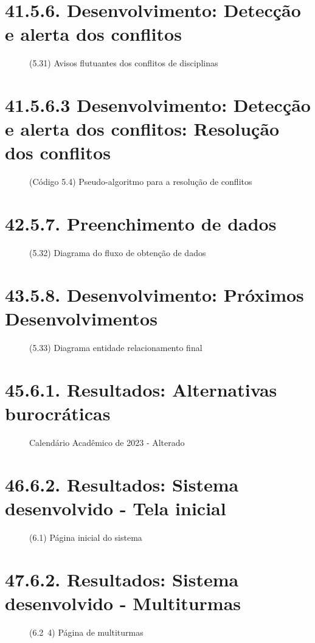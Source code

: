 \chapter*{41.5.6. Desenvolvimento: Detecção e alerta dos conflitos}
\begin{figure}[htpb]\caption{(5.31) Avisos flutuantes dos conflitos de disciplinas}\end{figure}
\chapter*{41.5.6.3 Desenvolvimento: Detecção e alerta dos conflitos: Resolução dos conflitos}
\begin{figure}[htpb]\caption{(Código 5.4) Pseudo-algoritmo para a resolução de conflitos}\end{figure}
\chapter*{42.5.7. Preenchimento de dados}
\begin{figure}[htpb]\caption{(5.32) Diagrama do fluxo de obtenção de dados}\end{figure}
\chapter*{43.5.8. Desenvolvimento: Próximos Desenvolvimentos}
\begin{figure}[htpb]\caption{(5.33) Diagrama entidade relacionamento final}\end{figure}
\chapter{45.6.1. Resultados: Alternativas burocráticas}
\begin{figure}[htpb]\caption{Calendário Acadêmico de 2023 - Alterado}\end{figure}
\chapter*{46.6.2. Resultados: Sistema desenvolvido - Tela inicial}
\begin{figure}[htpb]\caption{(6.1) Página inicial do sistema}\end{figure}
\chapter*{47.6.2. Resultados: Sistema desenvolvido - Multiturmas}
\begin{figure}[htpb]\caption{(6.2~4) Página de multiturmas}\end{figure}
